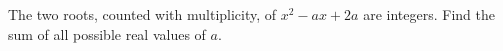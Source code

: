 The two roots, counted with multiplicity, of $x^2-ax+2a$ are integers. Find the sum of all possible real values of $a$.
